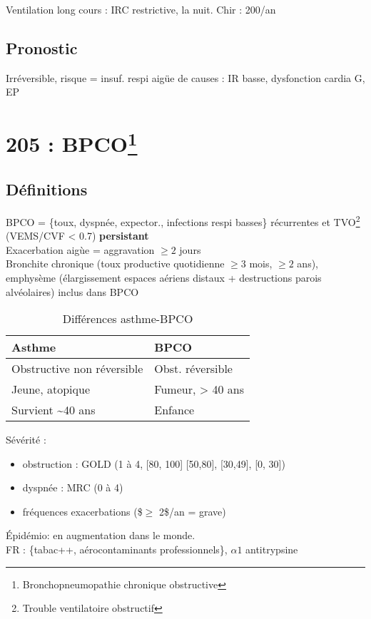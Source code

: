 \documentclass{article}
\begin{document}
Ventilation long cours : IRC restrictive, la nuit.
Chir : 200/an

\subsection{Pronostic}
\label{sec:org2ec66b4}
Irréversible, risque = insuf. respi aigüe de causes : IR basse, dysfonction
cardia G, EP


\section{205 : BPCO\footnote{Bronchopneumopathie chronique obstructive}}
\label{sec:205-bpco}

\subsection{Définitions}
BPCO = \{toux, dyspnée, expector., infections respi basses\} récurrentes et
TVO\footnote{Trouble ventilatoire obstructif} (VEMS/CVF < 0.7)
\textbf{persistant}\\
Exacerbation aigùe = aggravation \(\ge 2\) jours\\
Bronchite chronique (toux productive quotidienne \(\ge 3\) mois, \(\ge 2\) ans),
emphysème (élargissement espaces aériens distaux + destructions parois
alvéolaires) inclus dans BPCO\\
\begin{table}[htbp]
\caption{Différences asthme-BPCO}
\centering
\begin{tabular}{ll}
\toprule
Asthme & BPCO\\
\midrule
Obstructive non réversible & Obst. réversible\\
Jeune, atopique & Fumeur, > 40 ans\\
Survient \textasciitilde{}40 ans & Enfance\\
\bottomrule
\end{tabular}
\end{table}

Sévérité : 
\begin{itemize}
\item obstruction : GOLD (1 à 4, [80, 100] [50,80], [30,49], [0, 30])
\item dyspnée : MRC (0 à 4)
\item fréquences exacerbations (\$\(\ge\) 2\$/an = grave)
\end{itemize}

Épidémio: en augmentation dans le monde. \\
FR : \{tabac++, aérocontaminants professionnels\}, \(\alpha{}1\) antitrypsine
\end{document}
